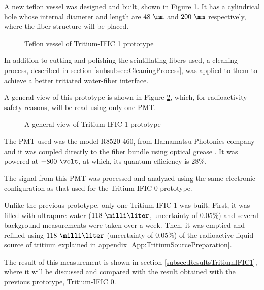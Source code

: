 A new teflon vessel was designed and built, shown in Figure \ref{fig:TeflonVesselTritumIFIC1}. It has a cylindrical hole whose internal diameter and length are $48~\mm$ and $200~\mm$ respectively, where the fiber structure will be placed. 

\begin{figure}[h]
 \centering
 \caption{Teflon vessel of Tritium-IFIC 1 prototype}
 \label{fig:TeflonVesselTritumIFIC1}
\end{figure}

In addition to cutting and polishing the scintillating fibers used, a cleaning process, described in section \ref{subsubsec:CleaningProcess}, was applied to them to achieve a better tritiated water-fiber interface.

A general view of this prototype is shown in Figure \ref{fig:TritumIFIC1}, which, for radioactivity safety reasons, will be read using only one PMT.

\begin{figure}[h]
 \centering
 \caption{A general view of Tritium-IFIC 1 prototype}
 \label{fig:TritumIFIC1}
\end{figure}

The PMT used was the model R8520-460, from Hamamatsu Photonics company \cite{DataSheetPMTs} and it was coupled directly to the fiber bundle using optical grease \cite{OpticalGrease}. It was powered at $-800~\volt$, at which, its quantum efficiency is $28\%$.

The signal from this PMT was processed and analyzed using the same electronic configuration as that used for the Tritium-IFIC 0 prototype.

Unlike the previous prototype, only one Tritium-IFIC 1 was built. First, it was filled with ultrapure water ($118~\milli\liter$, uncertainty of $0.05\%$) and several background measurements were taken over a week. Then, it was emptied and refilled using $118~\milli\liter$ (uncertainty of $0.05\%$) of the radioactive liquid source of tritium explained in appendix \ref{App:TritiumSourcePreparation}.

The result of this measurement is shown in section \ref{subsec:ResultsTritiumIFIC1}, where it will be discussed and compared with the result obtained with the previous prototype, Tritium-IFIC 0.